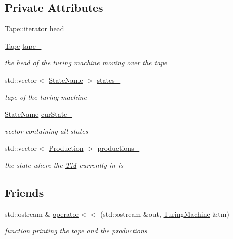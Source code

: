 \subsection*{\-Private \-Attributes}
\begin{DoxyCompactItemize}
\item 
\-Tape\-::iterator \hyperlink{classTM_1_1TuringMachine_a16c476c503a878de6f354339a283ca3b}{head\-\_\-}
\item 
\hyperlink{namespaceTM_a20b31cfe7d86b00db299e72ad48f70af}{\-Tape} \hyperlink{classTM_1_1TuringMachine_a4c95b19fbea6a3d73b68dea36cd389a0}{tape\-\_\-}
\begin{DoxyCompactList}\small\item\em the head of the turing machine moving over the tape \end{DoxyCompactList}\item 
std\-::vector$<$ \hyperlink{namespaceTM_a852554502c474841ede5736b807839ff}{\-State\-Name} $>$ \hyperlink{classTM_1_1TuringMachine_aa83fb53ce10f185f3f1859533cc20e0b}{states\-\_\-}
\begin{DoxyCompactList}\small\item\em tape of the turing machine \end{DoxyCompactList}\item 
\hyperlink{namespaceTM_a852554502c474841ede5736b807839ff}{\-State\-Name} \hyperlink{classTM_1_1TuringMachine_aaa6438ae548569a1f41e024d1f68eb84}{cur\-State\-\_\-}
\begin{DoxyCompactList}\small\item\em vector containing all states \end{DoxyCompactList}\item 
std\-::vector$<$ \hyperlink{namespaceTM_a87460339f40338ea4e37433443965554}{\-Production} $>$ \hyperlink{classTM_1_1TuringMachine_a1aacd1eca81b8f4ab37030b3cda19d13}{productions\-\_\-}
\begin{DoxyCompactList}\small\item\em the state where the \hyperlink{namespaceTM}{\-T\-M} currently in is \end{DoxyCompactList}\end{DoxyCompactItemize}
\subsection*{\-Friends}
\begin{DoxyCompactItemize}
\item 
std\-::ostream \& \hyperlink{classTM_1_1TuringMachine_a4edf359a625a3b3114cef725f5ca5337}{operator$<$$<$} (std\-::ostream \&out, \hyperlink{classTM_1_1TuringMachine}{\-Turing\-Machine} \&tm)
\begin{DoxyCompactList}\small\item\em function printing the tape and the productions \end{DoxyCompactList}\end{DoxyCompactItemize}


